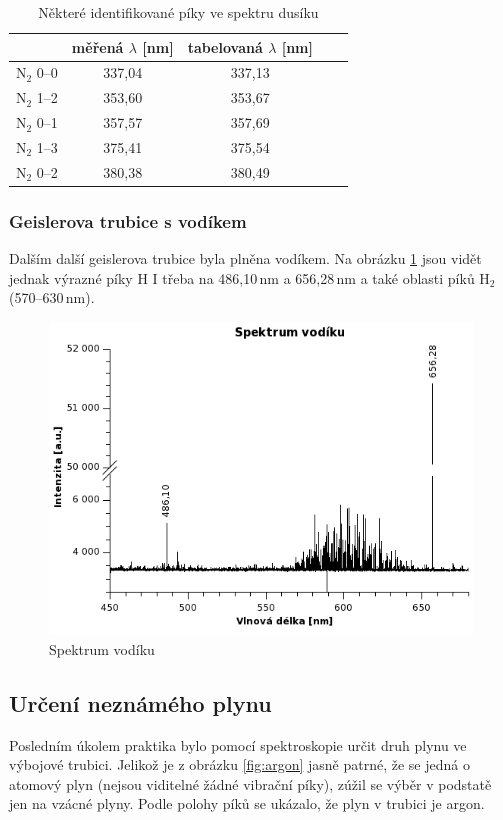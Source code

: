 \documentclass[12pt]{article}
\begin{document}
\begin{table}[h!]
 \centering
 \begin{tabular}{|c|c|c|c|c|}
  \hline
  {\bf } & {\bf měřená $\lambda$ [nm]} & {\bf tabelovaná $\lambda$ [nm]} \\
   \hline \hline
	N$_2$ 0--0 & 337,04 & 337,13 \\
	N$_2$ 1--2 & 353,60 & 353,67 \\
	N$_2$ 0--1 & 357,57 & 357,69 \\
	N$_2$ 1--3 & 375,41 & 375,54 \\
	N$_2$ 0--2 & 380,38 & 380,49 \\
   \hline
  \end{tabular}
  \caption{Některé identifikované píky ve spektru dusíku}
  \label{ref:n2}
\end{table}

\subsubsection{Geislerova trubice s vodíkem}
Dalším další geislerova trubice byla plněna vodíkem. Na obrázku \ref{fig:h} jsou vidět jednak výrazné píky H I třeba na 486,10\,nm a 656,28\,nm a také oblasti píků H$_2$ (570--630\,nm).

\begin{figure}[h!]
  \centering
  \includegraphics[width=13cm]{img/h.png}
  \caption{Spektrum vodíku}
  \label{fig:h} 
\end{figure}
\clearpage


\subsection{Určení neznámého plynu}
Posledním úkolem praktika bylo pomocí spektroskopie určit druh plynu ve výbojové trubici. Jelikož je z obrázku \ref{fig:argon} jasně patrné, že se jedná o atomový plyn (nejsou viditelné žádné vibrační píky), zúžil se výběr v podstatě jen na vzácné plyny. Podle polohy píků se ukázalo, že plyn v trubici je argon. 
\end{document}
